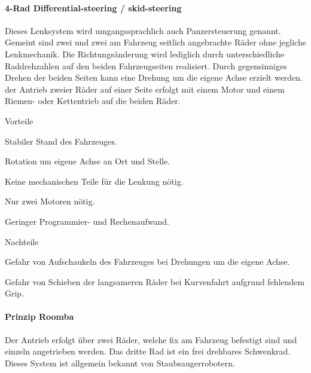 \documentclass[../main.tex]{subfiles}
\begin{document}
\paragraph{4-Rad Differential-steering / skid-steering}
Dieses Lenksystem wird umgangssprachlich auch Panzersteuerung genannt. Gemeint sind zwei und zwei am Fahrzeug seitlich angebrachte Räder ohne jegliche Lenkmechanik. Die Richtungsänderung wird lediglich durch unterschiedliche Raddrehzahlen auf den beiden Fahrzeugseiten realisiert. Durch gegensinniges Drehen der beiden Seiten kann eine Drehung um die eigene Achse erzielt werden. der Antrieb zweier Räder auf einer Seite erfolgt mit einem Motor und einem Riemen- oder Kettentrieb auf die beiden Räder.

\begin{minipage}[t]{0.48\textwidth}
    \begin{items}
        \item[Vorteile]
        \item Stabiler Stand des Fahrzeuges.
        \item Rotation um eigene Achse an Ort und Stelle.
        \item Keine mechanischen Teile für die Lenkung nötig.
        \item Nur zwei Motoren nötig.
        \item Geringer Programmier- und Rechenaufwand.
    \end{items}
\end{minipage}
\begin{minipage}[t]{0.48\textwidth}
    \begin{items}
      \item [Nachteile]
       \item Gefahr von Aufschaukeln des Fahrzeuges bei Drehungen um die eigene Achse.
      \item Gefahr von Schieben der langsameren Räder bei Kurvenfahrt aufgrund fehlendem Grip.
    \end{items}
\end{minipage}

\paragraph{Prinzip Roomba} \label{recherche-prinzip-roomba}
Der Antrieb erfolgt über zwei Räder, welche fix am Fahrzeug befestigt sind und einzeln angetrieben werden. Das dritte Rad ist ein frei drehbares Schwenkrad. Dieses System ist allgemein bekannt von Staubsaugerrobotern.
\end{document}
